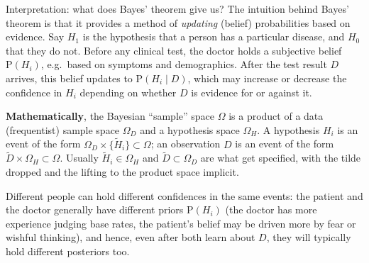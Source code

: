 \documentclass[aspectratio=169,10pt]{beamer}
\begin{document}
\begin{frame}[allowframebreaks]{Interpretation: what does Bayes' theorem give us?}
  The intuition behind Bayes' theorem is that it provides a method of
  \emph{updating} (belief) probabilities based on evidence. Say $H_1$ is the
  hypothesis that a person has a particular disease, and $H_0$ that they do
  not. Before any clinical test, the doctor holds a subjective belief
  $\mathrm P(H_i)$, e.g.\ based on symptoms and demographics. After the test
  result $D$ arrives, this belief updates to $\mathrm P(H_i\mid D)$, which
  may increase or decrease the confidence in $H_i$ depending on whether $D$
  is evidence for or against it.

  \textbf{Mathematically}, the Bayesian ``sample'' space $\Omega$ is a
  product of a data (frequentist) sample space $\Omega_D$ and a hypothesis
  space $\Omega_H$. A hypothesis $H_i$ is an event of the form
  $\Omega_D\times\{\tilde H_i\}\subset\Omega$; an observation $D$ is an
  event of the form $\tilde D\times\Omega_H\subset\Omega$. Usually
  $\tilde H_i\in\Omega_H$ and $\tilde D\subset\Omega_D$ are what get
  specified, with the tilde dropped and the lifting to the product space
  implicit.

  Different people can hold different confidences in the same events: the
  patient and the doctor generally have different priors $\mathrm P(H_i)$
  (the doctor has more experience judging base rates, the patient's belief
  may be driven more by fear or wishful thinking), and hence, even after
  both learn about $D$, they will typically hold different posteriors too.

  \framebreak


\end{frame}
\end{document}
